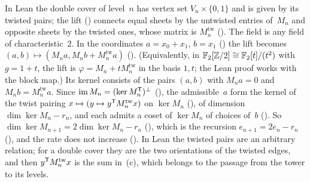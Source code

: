\begin{outline}
In Lean the double cover of level~$n$ has vertex set $V_n\times\{0,1\}$ and is given by its twisted pairs; the lift
() connects equal sheets by the untwisted entries of~$M_n$ and opposite sheets by the twisted ones, whose matrix
is $M_n^{\mathrm{tw}}$ (). The field is any field of characteristic~$2$. In the coordinates $a=x_0+x_1$,
$b=x_1$ () the lift becomes $(a,b)\mapsto(M_na,M_nb+M_n^{\mathrm{tw}}a)$ ().
(Equivalently, in $\mathbb{F}_2[\mathbb{Z}/2]\cong\mathbb{F}_2[t]/(t^2)$ with $g=1+t$, the lift is $\varphi=M_n+tM_n^{\mathrm{tw}}$ in the basis
$1,t$; the Lean proof works with the block map.) Its kernel consists of the
pairs $(a,b)$ with $M_na=0$ and $M_nb=M_n^{\mathrm{tw}}a$. Since $\operatorname{im}M_n=(\ker M_n^{\mathsf{T}})^\perp$
(), the admissible~$a$ form the kernel of the twist pairing
$x\mapsto(y\mapsto y^{\mathsf{T}} M_n^{\mathrm{tw}}x)$ on $\ker M_n$ (), of dimension $\dim\ker M_n-r_n$, and each
admits a coset of $\ker M_n$ of choices of~$b$ (). So $\dim\ker M_{n+1}=2\dim\ker M_n-r_n$
(), which is the recursion $e_{n+1}=2e_n-r_n$ (), and the rate does not increase
(). In Lean the twisted pairs are an arbitrary relation; for a double cover they are the two
orientations of the twisted edges, and then $y^{\mathsf{T}} M_n^{\mathrm{tw}}x$ is the sum in~(c), which belongs to the passage from the
tower to its levels.
\end{outline}

